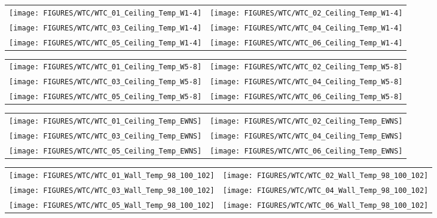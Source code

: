 \begin{figure}[p]
\begin{tabular*}{\textwidth}{l@{\extracolsep{\fill}}r}
\texttt{[image: FIGURES/WTC/WTC\_01\_Ceiling\_Temp\_W1-4]} &
\texttt{[image: FIGURES/WTC/WTC\_02\_Ceiling\_Temp\_W1-4]} \\
\texttt{[image: FIGURES/WTC/WTC\_03\_Ceiling\_Temp\_W1-4]} &
\texttt{[image: FIGURES/WTC/WTC\_04\_Ceiling\_Temp\_W1-4]} \\
\texttt{[image: FIGURES/WTC/WTC\_05\_Ceiling\_Temp\_W1-4]} &
\texttt{[image: FIGURES/WTC/WTC\_06\_Ceiling\_Temp\_W1-4]}
\end{tabular*}
\label{NIST_WTC_Ceiling_W1-4}
\end{figure}

\begin{figure}[p]
\begin{tabular*}{\textwidth}{l@{\extracolsep{\fill}}r}
\texttt{[image: FIGURES/WTC/WTC\_01\_Ceiling\_Temp\_W5-8]} &
\texttt{[image: FIGURES/WTC/WTC\_02\_Ceiling\_Temp\_W5-8]} \\
\texttt{[image: FIGURES/WTC/WTC\_03\_Ceiling\_Temp\_W5-8]} &
\texttt{[image: FIGURES/WTC/WTC\_04\_Ceiling\_Temp\_W5-8]} \\
\texttt{[image: FIGURES/WTC/WTC\_05\_Ceiling\_Temp\_W5-8]} &
\texttt{[image: FIGURES/WTC/WTC\_06\_Ceiling\_Temp\_W5-8]}
\end{tabular*}
\label{NIST_WTC_Ceiling_W5-8}
\end{figure}

\begin{figure}[p]
\begin{tabular*}{\textwidth}{l@{\extracolsep{\fill}}r}
\texttt{[image: FIGURES/WTC/WTC\_01\_Ceiling\_Temp\_EWNS]} &
\texttt{[image: FIGURES/WTC/WTC\_02\_Ceiling\_Temp\_EWNS]} \\
\texttt{[image: FIGURES/WTC/WTC\_03\_Ceiling\_Temp\_EWNS]} &
\texttt{[image: FIGURES/WTC/WTC\_04\_Ceiling\_Temp\_EWNS]} \\
\texttt{[image: FIGURES/WTC/WTC\_05\_Ceiling\_Temp\_EWNS]} &
\texttt{[image: FIGURES/WTC/WTC\_06\_Ceiling\_Temp\_EWNS]}
\end{tabular*}
\label{NIST_WTC_Ceiling_EWNS}
\end{figure}

\begin{figure}[p]
\begin{tabular*}{\textwidth}{l@{\extracolsep{\fill}}r}
\texttt{[image: FIGURES/WTC/WTC\_01\_Wall\_Temp\_98\_100\_102]} &
\texttt{[image: FIGURES/WTC/WTC\_02\_Wall\_Temp\_98\_100\_102]} \\
\texttt{[image: FIGURES/WTC/WTC\_03\_Wall\_Temp\_98\_100\_102]} &
\texttt{[image: FIGURES/WTC/WTC\_04\_Wall\_Temp\_98\_100\_102]} \\
\texttt{[image: FIGURES/WTC/WTC\_05\_Wall\_Temp\_98\_100\_102]} &
\texttt{[image: FIGURES/WTC/WTC\_06\_Wall\_Temp\_98\_100\_102]}
\end{tabular*}
\label{NIST_WTC_Wall_98_100_102}
\end{figure}


